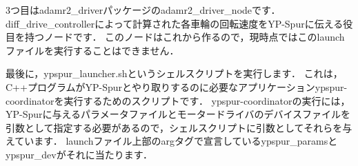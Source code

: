 \documentclass[{../../master}]{subfiles}
\begin{document}
3つ目は\textsf{adamr2\_driver}パッケージの\textsf{adamr2\_driver\_node}です．
\textsf{diff\_drive\_controller}によって計算された各車輪の回転速度をYP-Spurに伝える役目を持つノードです．
このノードはこれから作るので，現時点ではこのlaunchファイルを実行することはできません．

最後に，\textsf{ypspur\_launcher.sh}というシェルスクリプトを実行します．
これは，C++プログラムがYP-Spurとやり取りするのに必要なアプリケーション\textsf{ypspur-coordinator}を実行するためのスクリプトです．
\textsf{ypspur-coordinator}の実行には，YP-Spurに与えるパラメータファイルとモータードライバのデバイスファイルを引数として指定する必要があるので，シェルスクリプトに引数としてそれらを与えています．
launchファイル上部の\textsf{\<arg\>}タグで宣言している\textsf{ypspur\_params}と\textsf{ypspur\_dev}がそれに当たります．
\end{document}
